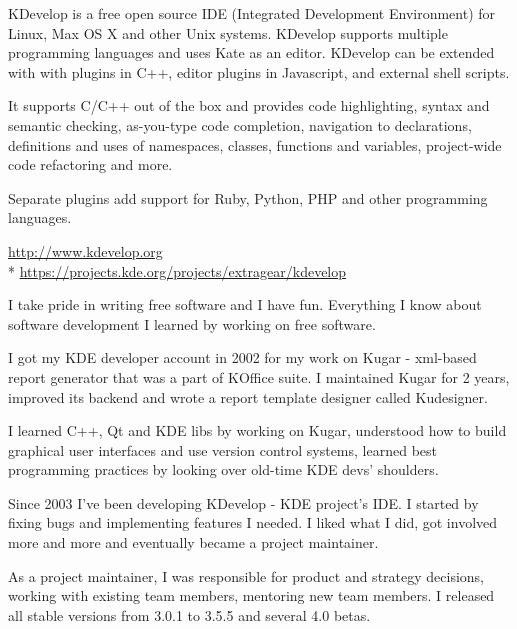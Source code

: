 \documentclass[12pt]{letter}
\begin{document}
\begin{llist}
  \location{}

  \startexperience

           \item KDevelop is a free open source IDE (Integrated Development Environment) for Linux, Max OS X and other Unix systems. KDevelop supports multiple programming languages and uses Kate as an editor. KDevelop can be extended with with plugins in C++, editor plugins in Javascript, and external shell scripts.

           \item It supports C/C++ out of the box and provides code highlighting, syntax and semantic checking,  as-you-type code completion, navigation to declarations, definitions and uses of namespaces, classes, functions and variables, project-wide code refactoring and more.

            \item Separate plugins add support for Ruby, Python, PHP and other programming languages.

            \item \url{http://www.kdevelop.org}\\*
                  \url{https://projects.kde.org/projects/extragear/kdevelop}

            \item I take pride in writing free software and I have fun. Everything I know about software development I learned by working on free software.

            \item I got my KDE developer account in 2002 for my work on Kugar - xml-based report generator that was a part of KOffice suite. I maintained Kugar for 2 years, improved its backend and wrote a report template designer called Kudesigner.

            \item I learned C++, Qt and KDE libs by working on Kugar, understood how to build graphical user interfaces and use   version control systems, learned best programming practices by looking over old-time KDE devs' shoulders.

            \item Since 2003 I've been developing KDevelop - KDE project's IDE. I started by fixing bugs and implementing features I needed. I liked what I did, got involved more and more and eventually became a project maintainer.

            \item As a project maintainer, I was responsible for product and strategy decisions, working with existing team members, mentoring new team members. I released all stable versions from 3.0.1 to 3.5.5 and several 4.0 betas.


\end{llist}
\end{document}
